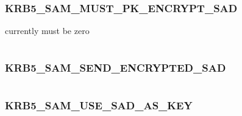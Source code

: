 \documentclass[letterpaper,10pt,english]{sphinxmanual}
\begin{document}
\subsubsection{KRB5\_SAM\_MUST\_PK\_ENCRYPT\_SAD}
\label{appdev/refs/macros/KRB5_SAM_MUST_PK_ENCRYPT_SAD:krb5-sam-must-pk-encrypt-sad}\label{appdev/refs/macros/KRB5_SAM_MUST_PK_ENCRYPT_SAD:krb5-sam-must-pk-encrypt-sad-data}\label{appdev/refs/macros/KRB5_SAM_MUST_PK_ENCRYPT_SAD::doc}

\begin{fulllineitems}
\label{appdev/refs/macros/KRB5_SAM_MUST_PK_ENCRYPT_SAD:KRB5_SAM_MUST_PK_ENCRYPT_SAD}
\end{fulllineitems}


currently must be zero

\begin{tabulary}{\linewidth}{|L|L|}
\hline

 & 
\\
\hline\end{tabulary}



\subsubsection{KRB5\_SAM\_SEND\_ENCRYPTED\_SAD}
\label{appdev/refs/macros/KRB5_SAM_SEND_ENCRYPTED_SAD:krb5-sam-send-encrypted-sad}\label{appdev/refs/macros/KRB5_SAM_SEND_ENCRYPTED_SAD::doc}\label{appdev/refs/macros/KRB5_SAM_SEND_ENCRYPTED_SAD:krb5-sam-send-encrypted-sad-data}

\begin{fulllineitems}
\label{appdev/refs/macros/KRB5_SAM_SEND_ENCRYPTED_SAD:KRB5_SAM_SEND_ENCRYPTED_SAD}
\end{fulllineitems}


\begin{tabulary}{\linewidth}{|L|L|}
\hline

 & 
\\
\hline\end{tabulary}



\subsubsection{KRB5\_SAM\_USE\_SAD\_AS\_KEY}
\label{appdev/refs/macros/KRB5_SAM_USE_SAD_AS_KEY::doc}\label{appdev/refs/macros/KRB5_SAM_USE_SAD_AS_KEY:krb5-sam-use-sad-as-key}\label{appdev/refs/macros/KRB5_SAM_USE_SAD_AS_KEY:krb5-sam-use-sad-as-key-data}
\end{document}
